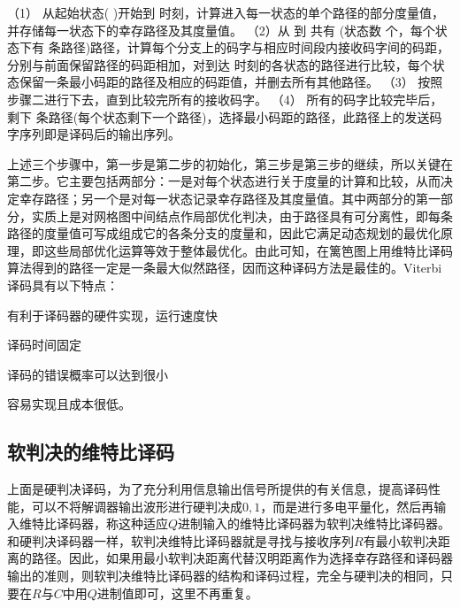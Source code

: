 （1） 从起始状态( )开始到 时刻，计算进入每一状态的单个路径的部分度量值，并存储每一状态下的幸存路径及其度量值。
（2）从 到 共有 (状态数 个，每个状态下有 条路径)路径，计算每个分支上的码字与相应时间段内接收码字间的码距，分别与前面保留路径的码距相加，对到达 时刻的各状态的路径进行比较，每个状态保留一条最小码距的路径及相应的码距值，并删去所有其他路径。
（3） 按照步骤二进行下去，直到比较完所有的接收码字。
（4） 所有的码字比较完毕后，剩下 条路径(每个状态剩下一个路径)，选择最小码距的路径，此路径上的发送码字序列即是译码后的输出序列。

上述三个步骤中，第一步是第二步的初始化，第三步是第三步的继续，所以关键在第二步。它主要包括两部分：一是对每个状态进行关于度量的计算和比较，从而决定幸存路径；另一个是对每一状态记录幸存路径及其度量值。其中两部分的第一部分，实质上是对网格图中间结点作局部优化判决，由于路径具有可分离性，即每条路径的度量值可写成组成它的各条分支的度量和，因此它满足动态规划的最优化原理，即这些局部优化运算等效于整体最优化。由此可知，在篱笆图上用维特比译码算法得到的路径一定是一条最大似然路径，因而这种译码方法是最佳的。Viterbi译码具有以下特点：
\begin{publist}
	\item 有利于译码器的硬件实现，运行速度快
	\item 译码时间固定
	\item 译码的错误概率可以达到很小
	\item 容易实现且成本很低。
\end{publist}

\subsection{软判决的维特比译码}
上面是硬判决译码，为了充分利用信息输出信号所提供的有关信息，提高译码性能，可以不将解调器输出波形进行硬判决成${0,1}$，而是进行多电平量化，然后再输入维特比译码器，称这种适应$Q$进制输入的维特比译码器为软判决维特比译码器。和硬判决译码器一样，软判决维特比译码器就是寻找与接收序列$R$有最小软判决距离的路径。因此，如果用最小软判决距离代替汉明距离作为选择幸存路径和译码器输出的准则，则软判决维特比译码器的结构和译码过程，完全与硬判决的相同，只要在$R$与$C$中用$Q$进制值即可，这里不再重复。
